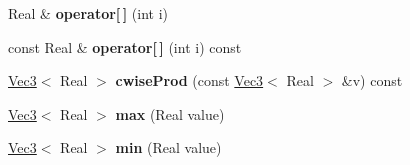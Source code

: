 \begin{DoxyCompactItemize}
\item 
\hypertarget{classhokusai_1_1Vec3_a5c876e98eb43d9b513f0fb0e5e34dba5}{Real \& {\bfseries operator\mbox{[}$\,$\mbox{]}} (int i)}\label{classhokusai_1_1Vec3_a5c876e98eb43d9b513f0fb0e5e34dba5}

\item 
\hypertarget{classhokusai_1_1Vec3_a2192f11f3de41ec8be5cbb3568409a5e}{const Real \& {\bfseries operator\mbox{[}$\,$\mbox{]}} (int i) const }\label{classhokusai_1_1Vec3_a2192f11f3de41ec8be5cbb3568409a5e}

\item 
\hypertarget{classhokusai_1_1Vec3_a9f69c4933bf0860393f3722e8e79f981}{\hyperlink{classhokusai_1_1Vec3}{Vec3}$<$ Real $>$ {\bfseries cwise\+Prod} (const \hyperlink{classhokusai_1_1Vec3}{Vec3}$<$ Real $>$ \&v) const }\label{classhokusai_1_1Vec3_a9f69c4933bf0860393f3722e8e79f981}

\item 
\hypertarget{classhokusai_1_1Vec3_a413400e0e2797f465075675b960b9dbc}{\hyperlink{classhokusai_1_1Vec3}{Vec3}$<$ Real $>$ {\bfseries max} (Real value)}\label{classhokusai_1_1Vec3_a413400e0e2797f465075675b960b9dbc}

\item 
\hypertarget{classhokusai_1_1Vec3_ad99c83d5427b072168f778d47865ca15}{\hyperlink{classhokusai_1_1Vec3}{Vec3}$<$ Real $>$ {\bfseries min} (Real value)}\label{classhokusai_1_1Vec3_ad99c83d5427b072168f778d47865ca15}

\end{DoxyCompactItemize}
